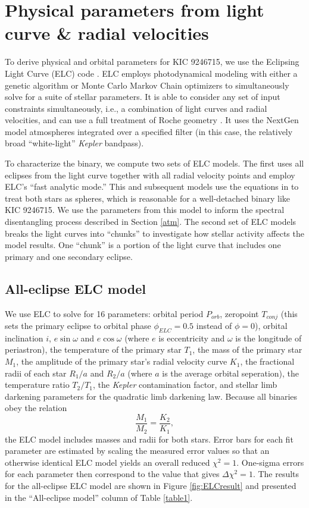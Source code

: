 \section{Physical parameters from light curve \& radial velocities}\label{model}
To derive physical and orbital parameters for KIC 9246715, we use the Eclipsing Light Curve (ELC) code \citep{oro00}. ELC employs photodynamical modeling with either a genetic algorithm or Monte Carlo Markov Chain optimizers to simultaneously solve for a suite of stellar parameters. It is able to consider any set of input constraints simultaneously, i.e., a combination of light curves and radial velocities, and can use a full treatment of Roche geometry \citep{kop69,avn75}. It uses the NextGen model atmospheres integrated over a specified filter (in this case, the relatively broad ``white-light'' \emph{Kepler} bandpass).

To characterize the binary, we compute two sets of ELC models. The first uses all eclipses from the light curve together with all radial velocity points and employ ELC's ``fast analytic mode.'' This and subsequent models use the equations in \citet{man02} to treat both stars as spheres, which is reasonable for a well-detached binary like KIC 9246715. We use the parameters from this model to inform the spectral disentangling process described in Section \ref{atm}. The second set of ELC models breaks the light curves into ``chunks'' to investigate how stellar activity affects the model results. One ``chunk'' is a portion of the light curve that includes one primary and one secondary eclipse.

\subsection{All-eclipse ELC model}

We use ELC to solve for 16 parameters: orbital period $P_{orb}$, zeropoint $T_{conj}$ (this sets the primary eclipse to orbital phase $\phi_{ELC} = 0.5$ instead of $\phi = 0$), orbital inclination $i$, $e \sin \omega$ and $e \cos \omega$ (where $e$ is eccentricity and $\omega$ is the longitude of periastron), the temperature of the primary star $T_1$, the mass of the primary star $M_1$, the amplitude of the primary star's radial velocity curve $K_1$, the fractional radii of each star $R_1/a$ and $R_2/a$ (where $a$ is the average orbital seperation), the temperature ratio $T_2/T_1$, the \emph{Kepler} contamination factor, and stellar limb darkening parameters for the quadratic limb darkening law. Because all binaries obey the relation
\begin{equation}
\frac{M_1}{M_2} = \frac{K_2}{K_1},
\end{equation}
the ELC model includes masses and radii for both stars. Error bars for each fit parameter are estimated by scaling the measured error values so that an otherwise identical ELC model yields an overall reduced $\chi^2 = 1$. One-sigma errors for each parameter then correspond to the value that gives $\Delta \chi^2 = 1$. The results for the all-eclipse ELC model are shown in Figure \ref{fig:ELCresult} and presented in the ``All-eclipse model'' column of Table \ref{table1}.

